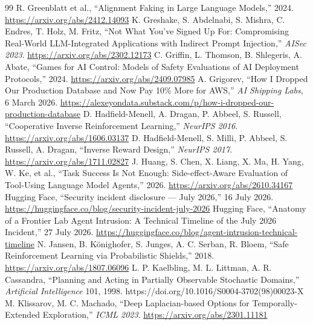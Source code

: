 \documentclass{article}
\begin{document}
\begin{thebibliography}{99}
 R. Greenblatt et al., ``Alignment Faking in Large Language Models,'' 2024. \url{https://arxiv.org/abs/2412.14093}
 K. Greshake, S. Abdelnabi, S. Mishra, C. Endres, T. Holz, M. Fritz, ``Not What You've Signed Up For: Compromising Real-World LLM-Integrated Applications with Indirect Prompt Injection,'' \emph{AISec 2023}. \url{https://arxiv.org/abs/2302.12173}
 C. Griffin, L. Thomson, B. Shlegeris, A. Abate, ``Games for AI Control: Models of Safety Evaluations of AI Deployment Protocols,'' 2024. \url{https://arxiv.org/abs/2409.07985}
 A. Grigorev, ``How I Dropped Our Production Database and Now Pay 10\% More for AWS,'' \emph{AI Shipping Labs}, 6 March 2026. \url{https://alexeyondata.substack.com/p/how-i-dropped-our-production-database}
 D. Hadfield-Menell, A. Dragan, P. Abbeel, S. Russell, ``Cooperative Inverse Reinforcement Learning,'' \emph{NeurIPS 2016}. \url{https://arxiv.org/abs/1606.03137}
 D. Hadfield-Menell, S. Milli, P. Abbeel, S. Russell, A. Dragan, ``Inverse Reward Design,'' \emph{NeurIPS 2017}. \url{https://arxiv.org/abs/1711.02827}
 J. Huang, S. Chen, X. Liang, X. Ma, H. Yang, W. Ke, et al., ``Task Success Is Not Enough: Side-effect-Aware Evaluation of Tool-Using Language Model Agents,'' 2026. \url{https://arxiv.org/abs/2610.34167}
 Hugging Face, ``Security incident disclosure --- July 2026,'' 16 July 2026. \url{https://huggingface.co/blog/security-incident-july-2026}
 Hugging Face, ``Anatomy of a Frontier Lab Agent Intrusion: A Technical Timeline of the July 2026 Incident,'' 27 July 2026. \url{https://huggingface.co/blog/agent-intrusion-technical-timeline}
 N. Jansen, B. Könighofer, S. Junges, A. C. Serban, R. Bloem, ``Safe Reinforcement Learning via Probabilistic Shields,'' 2018. \url{https://arxiv.org/abs/1807.06096}
 L. P. Kaelbling, M. L. Littman, A. R. Cassandra, ``Planning and Acting in Partially Observable Stochastic Domains,'' \emph{Artificial Intelligence} 101, 1998. https://doi.org/10.1016/S0004-3702(98)00023-X
 M. Klissarov, M. C. Machado, ``Deep Laplacian-based Options for Temporally-Extended Exploration,'' \emph{ICML 2023}. \url{https://arxiv.org/abs/2301.11181}

\end{thebibliography}
\end{document}
